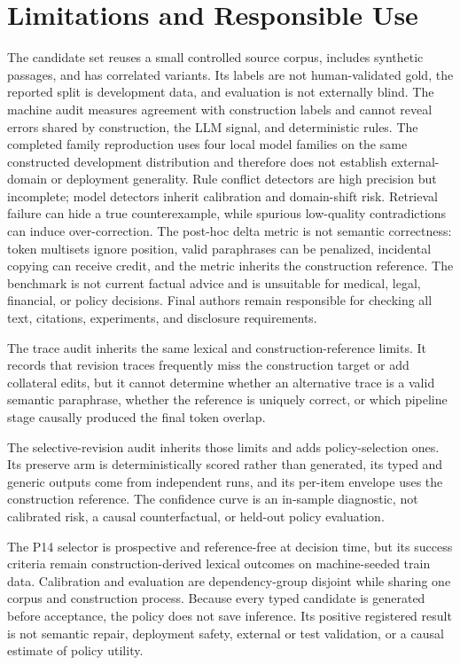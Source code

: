 \documentclass[letterpaper]{article}
\begin{document}
\section{Limitations and Responsible Use}
The candidate set reuses a small controlled source corpus, includes synthetic passages, and has correlated variants. Its labels are not human-validated gold, the reported split is development data, and evaluation is not externally blind. The machine audit measures agreement with construction labels and cannot reveal errors shared by construction, the LLM signal, and deterministic rules. The completed family reproduction uses four local model families on the same constructed development distribution and therefore does not establish external-domain or deployment generality. Rule conflict detectors are high precision but incomplete; model detectors inherit calibration and domain-shift risk. Retrieval failure can hide a true counterexample, while spurious low-quality contradictions can induce over-correction. The post-hoc delta metric is not semantic correctness: token multisets ignore position, valid paraphrases can be penalized, incidental copying can receive credit, and the metric inherits the construction reference. The benchmark is not current factual advice and is unsuitable for medical, legal, financial, or policy decisions. Final authors remain responsible for checking all text, citations, experiments, and disclosure requirements.

The trace audit inherits the same lexical and construction-reference limits.
It records that revision traces frequently miss the construction target or add
collateral edits, but it cannot determine whether an alternative trace is a
valid semantic paraphrase, whether the reference is uniquely correct, or which
pipeline stage causally produced the final token overlap.

The selective-revision audit inherits those limits and adds policy-selection
ones. Its preserve arm is deterministically scored rather than generated, its
typed and generic outputs come from independent runs, and its per-item envelope
uses the construction reference. The confidence curve is an in-sample
diagnostic, not calibrated risk, a causal counterfactual, or held-out policy
evaluation.

The P14 selector is prospective and reference-free at decision time, but its
success criteria remain construction-derived lexical outcomes on machine-seeded
train data. Calibration and evaluation are dependency-group disjoint while
sharing one corpus and construction process. Because every typed candidate is
generated before acceptance, the policy does not save inference. Its positive
registered result is not semantic repair, deployment safety, external or test
validation, or a causal estimate of policy utility.
\end{document}
